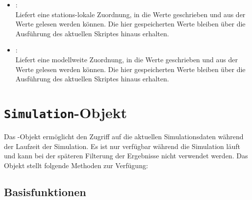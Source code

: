 \begin{itemize}
\item
{}:\\
Liefert eine stations-lokale Zuordnung, in die Werte geschrieben und aus der Werte gelesen werden können.
Die hier gespeicherten Werte bleiben über die Ausführung des aktuellen Skriptes hinaus erhalten.

\item
{}:\\
Liefert eine modellweite Zuordnung, in die Werte geschrieben und aus der Werte gelesen werden können.
Die hier gespeicherten Werte bleiben über die Ausführung des aktuellen Skriptes hinaus erhalten.
	
\end{itemize}



\chapter{\texttt{Simulation}-Objekt}

Das -Objekt ermöglicht den Zugriff auf die aktuellen Simulationsdaten während
der Laufzeit der Simulation. Es ist nur verfügbar während die Simulation läuft und kann bei der
späteren Filterung der Ergebnisse nicht verwendet werden. Das Objekt stellt folgende Methoden zur Verfügung:

\section{Basisfunktionen}

